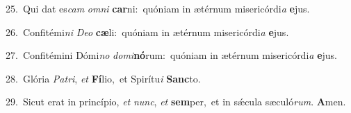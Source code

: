 {\numbfont\textcolor{\numbcolor}{25.}}~Qui dat es\textit{cam} \textit{om}\-\textit{ni} \textbf{car}\-ni:~\star quóniam in ætérnum misericórdi\textit{a} \textbf{e}\-jus.\par
{\numbfont\textcolor{\numbcolor}{26.}}~Confitémi\textit{ni} \textit{De}\-\textit{o} \textbf{cæ}\-li:~\star quóniam in ætérnum misericórdi\textit{a} \textbf{e}\-jus.\par
{\numbfont\textcolor{\numbcolor}{27.}}~Confitémini Dómi\textit{no} \textit{do}\-\textit{mi}\textbf{nó}rum:~\star quóniam in ætérnum misericórdi\textit{a} \textbf{e}\-jus.\par
{\numbfont\textcolor{\numbcolor}{28.}}~Glória \textit{Pa}\-\textit{tri}, \textit{et} \textbf{Fí}\-lio,~\star et Spirítu\textit{i} \textbf{Sanc}\-to.\par
{\numbfont\textcolor{\numbcolor}{29.}}~Sicut erat in princípio, \textit{et} \textit{nunc}\-, \textit{et} \textbf{sem}\-per,~\star et in sǽcula sæculó\-\textit{rum}\-. \textbf{A}\-men.\par
